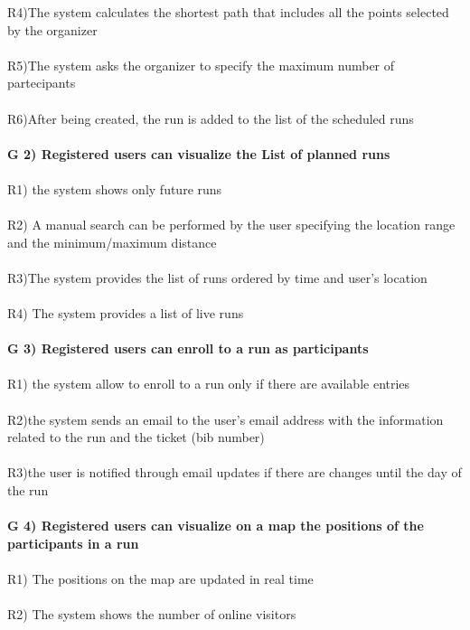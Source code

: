 R4)The system calculates the shortest path that includes all the points selected by the organizer \\ \\   

R5)The system asks the organizer to specify the maximum number of partecipants \\ \\

R6)After being created, the run is added to the list of the scheduled runs \\ \\
\textbf{G 2) Registered users can visualize the List of planned runs} \\ \\
R1) the system shows only future runs \\ \\ 

R2) A manual search can be performed by the user specifying the location range and the minimum/maximum distance \\ \\ 
R3)The system provides the list of runs ordered by time and user’s location \\ \\
R4) The system provides a list of live runs \\ \\
\textbf{G 3) Registered users can enroll to a run as participants} \\ \\
R1) the system allow to enroll to a run only if there are available entries \\ \\
R2)the system sends an email to the user’s email address with the information related to the run and the ticket (bib number) \\ \\
R3)the user is notified through email updates if there are changes until the day of the run \\ \\
\textbf{G 4) Registered users can visualize on a map the positions of the participants in a run} \\ \\	
R1) The positions on the map are updated in real time \\ \\
R2) The system shows the number of online visitors \\


